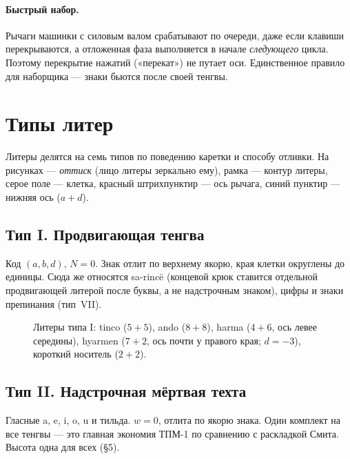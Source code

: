 \documentclass[11pt,a4paper]{article}
\newlength\tgem \setlength\tgem{5mm}
\newcommand\tgu{0.001\tgem}
\begin{document}
\paragraph{Быстрый набор.} Рычаги машинки с силовым валом срабатывают по очереди, даже если клавиши перекрываются, а отложенная фаза выполняется в начале \emph{следующего} цикла. Поэтому перекрытие нажатий («перекат») не путает оси. Единственное правило для наборщика — знаки бьются после своей тенгвы.

\section{Типы литер}
\label{sec:types}

Литеры делятся на семь типов по поведению каретки и способу отливки. На рисунках — \emph{оттиск} (лицо литеры зеркально ему), рамка — контур литеры, серое поле — клетка, красный штрихпунктир — ось рычага, синий пунктир — нижняя ось ($a + d$).

\subsection*{Тип I. Продвигающая тенгва}

Код $(a, b, d)$, $N = 0$. Знак отлит по верхнему якорю, края клетки округлены до единицы. Сюда же относятся sa-rincë (концевой крюк ставится отдельной продвигающей литерой после буквы, а не надстрочным знаком), цифры и знаки препинания (тип~VII).

\begin{figure}[h]
\centering
\setlength\tgem{30mm}
\begin{tikzpicture}[x=\tgu,y=\tgu]

\end{tikzpicture}
\caption{Литеры типа I: tinco ($5+5$), ando ($8+8$), harma ($4+6$, ось левее середины), hyarmen ($7+2$, ось почти у правого края; $d = -3$), короткий носитель ($2+2$).}
\end{figure}

\subsection*{Тип II. Надстрочная мёртвая техта}

Гласные a, e, i, o, u и тильда. $w = 0$, отлита по якорю знака. Один комплект на все тенгвы — это главная экономия ТПМ-1 по сравнению с раскладкой Смита. Высота одна для всех (\S5).
\end{document}
